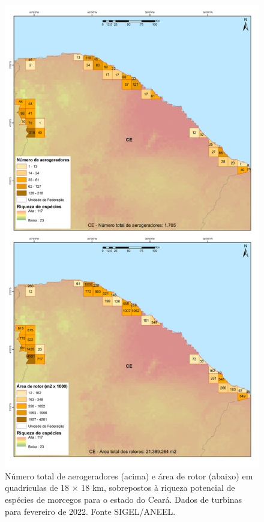 \documentclass[
  oneside]{scrbook}
\begin{document}
\begin{figure}[H]

{\centering \includegraphics[width=0.75\linewidth]{imagens/cap09/Figura_9.7} 

}

\caption{Número total de aerogeradores (acima) e área de rotor (abaixo) em quadrículas de 18 × 18 km, sobrepostos à riqueza potencial de espécies de morcegos para o estado do Ceará. Dados de turbinas para fevereiro de 2022. Fonte SIGEL/ANEEL.}\label{fig:72}
\end{figure}
\end{document}
